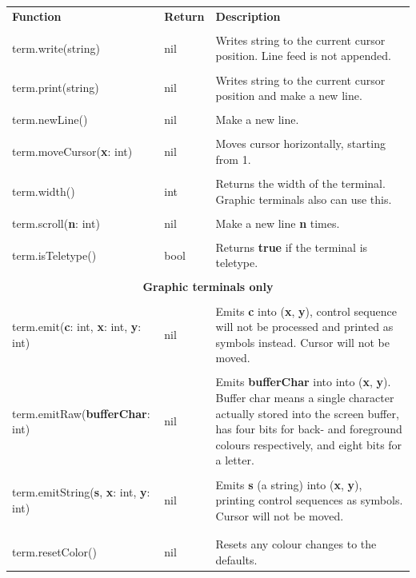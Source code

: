 \documentclass[10pt, stock]{memoir}
\begin{document}
\begin{tabularx}{\textwidth}{l l X}
	\textbf{\large Function} & \textbf{\large Return} & \textbf{\large Description}
	\\ \\
	\endhead
	term.write(string) & nil & Writes string to the current cursor position. Line feed is not appended.
	\\ \\
	term.print(string) & nil & Writes string to the current cursor position and make a new line.
	\\ \\
	term.newLine() & nil & Make a new line.
	\\ \\
	term.moveCursor(\textbf{x}: int) & nil & Moves cursor horizontally, starting from 1.
	\\ \\
	term.width() & int & Returns the width of the terminal. Graphic terminals also can use this.
	\\ \\
	term.scroll(\textbf{n}: int) & nil & Make a new line \textbf{n} times.
	\\ \\
	term.isTeletype() & bool & Returns \textbf{true} if the terminal is teletype.
	\\ \\
	\multicolumn{3}{c}{\textbf{Graphic terminals only}}
	\\ \\
	term.emit(\textbf{c}: int, \textbf{x}: int, \textbf{y}: int) & nil & Emits \textbf{c} into (\textbf{x}, \textbf{y}), control sequence will not be processed and printed as symbols instead. Cursor will not be moved.
	\\ \\
	term.emitRaw(\textbf{bufferChar}: int) & nil & Emits \textbf{bufferChar} into into (\textbf{x}, \textbf{y}). Buffer char means a single character actually stored into the screen buffer, has four bits for back- and foreground colours respectively, and eight bits for a letter.
	\\ \\
	term.emitString(\textbf{s}, \textbf{x}: int, \textbf{y}: int) & nil & Emits \textbf{s} (a string) into (\textbf{x}, \textbf{y}), printing control sequences as symbols. Cursor will not be moved.
	\\ \\
	\begin{tabular}[t]{@{}l@{}}term.resetColour()\\term.resetColor()\end{tabular} & nil & Resets any colour changes to the defaults.

\end{tabularx}
\end{document}
